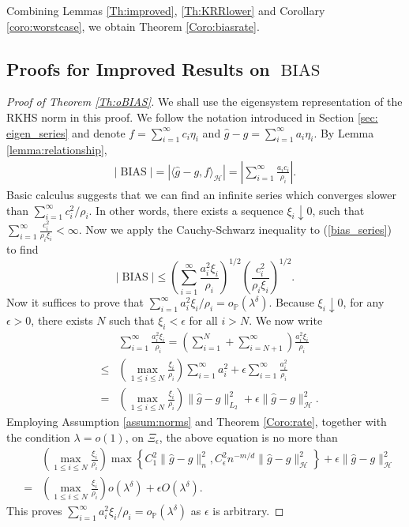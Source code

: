 \documentclass[12pt]{article}
\theoremstyle{plain}
\theoremstyle{remark}
\begin{document}
Combining Lemmas \ref{Th:improved}, \ref{Th:KRRlower} and Corollary \ref{coro:worstcase}, we obtain Theorem \ref{Coro:biasrate}.

\subsection{Proofs for Improved Results on $\operatorname{BIAS}$}
\begin{proof}[Proof of Theorem \ref{Th:oBIAS}]
    We shall use the eigensystem representation of the RKHS norm in this proof. We follow the notation introduced in Section \ref{sec: eigen_series} and denote $f=\sum_{i=1}^\infty c_i \eta_i$ and $\hat{g}-g=\sum_{i=1}^\infty a_i \eta_i$. By Lemma \ref{lemma:relationship},
    \begin{eqnarray}\label{bias_series}
        |\operatorname{BIAS}|=|\langle \hat{g}-g,f\rangle_\mathcal{H}|=\left|\sum_{i=1}^\infty \frac{a_ic_i}{\rho_i}\right|.
    \end{eqnarray}
    Basic calculus suggests that we can find an infinite series which converges slower than    $
        \sum_{i=1}^\infty c_i^2/\rho_i$. In other words, there exists a sequence $\xi_i\downarrow 0$, such that
        $\sum_{i=1}^\infty \frac{c_i^2}{\rho_i\xi_i}<\infty$. Now we apply the Cauchy-Schwarz inequality to (\ref{bias_series}) to find
        \[|\operatorname{BIAS}|\leq \left(\sum_{i=1}^\infty\frac{a_i^2\xi_i}{\rho_i}\right)^{1/2}\left(\frac{c_i^2}{\rho_i\xi_i}\right)^{1/2}.\]
        Now it suffices to prove that $\sum_{i=1}^\infty a_i^2\xi_i/\rho_i=o_\mathbb{P}(\lambda^\delta)$. Because $\xi_i\downarrow 0$, for any $\epsilon>0$, there exists $N$ such that $\xi_i<\epsilon$ for all $i>N$. We now write
        \begin{eqnarray*}
            &&\sum_{i=1}^\infty \frac{a_i^2 \xi_i}{\rho_i}=\left(\sum_{i=1}^N+\sum_{i=N+1}^\infty\right) \frac{a_i^2 \xi_i}{\rho_i}\\
            &\leq &\left(\max_{1\leq i\leq N}\frac{\xi_i}{\rho_i}\right)\sum_{i=1}^\infty a_i^2+\epsilon \sum_{i=1}^\infty \frac{a_i^2}{\rho_i}\\
            &=&\left(\max_{1\leq i\leq N}\frac{\xi_i}{\rho_i}\right)\|\hat{g}-g\|^2_{L_2}+\epsilon\|\hat{g}-g\|^2_\mathcal{H}.
        \end{eqnarray*}
        Employing Assumption \ref{assum:norms} and Theorem \ref{Coro:rate}, together with the condition $\lambda=o(1)$, on $\Xi_\epsilon$, the above equation is no more than
        \begin{eqnarray*}
            &&\left(\max_{1\leq i\leq N}\frac{\xi_i}{\rho_i}\right)\max\left\{C_1^2 \|\hat{g}-g\|_{n}^2,C_\epsilon^2 n^{-m/d}\|\hat{g}-g\|^2_{\mathcal{H}}\right\}+\epsilon\|\hat{g}-g\|^2_\mathcal{H}\\
            &=&\left(\max_{1\leq i\leq N}\frac{\xi_i}{\rho_i}\right)o(\lambda^\delta)+\epsilon O(\lambda^\delta).
        \end{eqnarray*}
        This proves $\sum_{i=1}^\infty a_i^2\xi_i/\rho_i=o_\mathbb{P}(\lambda^\delta)$ as $\epsilon$ is arbitrary.
\end{proof}
\end{document}

